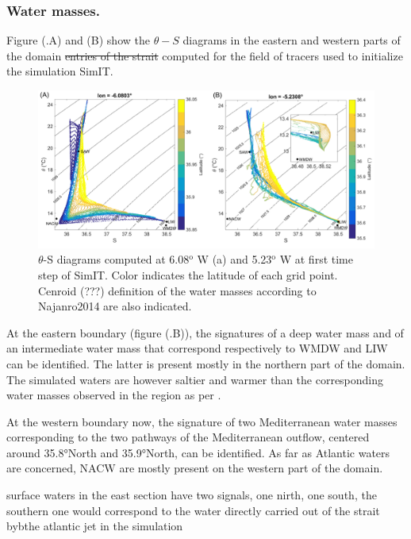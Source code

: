 \subsubsection{Water masses.}
\label{sectionWaterMasses}
Figure (.A) and (B) show \color{blue} the $\theta-S$ diagrams in the eastern and western parts of the domain \color{black} \sout{entries of the strait} computed for \color{blue}the field of tracers used to initialize the \color{black} simulation SimIT. 
\begin{figure}[!h]
        \includegraphics[width=\textwidth]{./GBR3D/WM_ini_IES.png}
        \caption{$\theta$-S diagrams computed at 6.08$^\text{o}$ W (a) and 5.23$^\text{o}$ W at first time step of SimIT. Color indicates the latitude of each grid point. \color{green}Cenroid (???) \color{black}definition of the water masses according to Najanro2014 are also indicated.}
        \label{Fig_Ini_WM3D}
\end{figure}

At the eastern boundary (figure (.B)), the signatures of a deep water mass and of an intermediate water mass that correspond respectively to WMDW and LIW can be identified. The latter is present mostly in the northern part of the domain. The simulated waters are however saltier and warmer than the corresponding water masses observed in the region as per \citet{naranjo_2014}.

At the western boundary now, the signature of two Mediterranean water masses corresponding to the two pathways of the Mediterranean outflow, centered around 35.8°North and 35.9°North, can be identified.
As far as Atlantic waters are concerned, NACW are mostly present on the western part of the domain. 

\color{red}surface waters in the east section have two signals, one nirth, one south, the southern one would correspond to the water directly carried out of the strait bybthe atlantic jet in the simulation\color{black}

